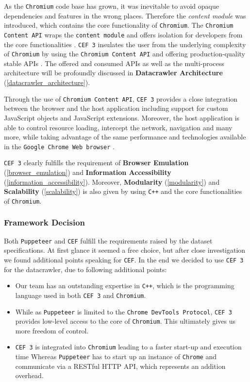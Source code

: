 As the \texttt{Chromium} code base has grown, it was inevitable to avoid opaque dependencies and features in the wrong places. Therefore the \textit{content module} was introduced, which contains the core functionality of \texttt{Chromium}. The \texttt{Chromium Content API} wraps the \texttt{content module} and offers isolation for developers from the core functionalities \cite{ChromiumContentAPI}.
\texttt{CEF 3} insulates the user from the underlying complexity of \texttt{Chromium} by using the \texttt{Chromium Content API} and offering production-quality stable APIs \cite{CEFGeneralUsage}. The offered and consumed APIs as well as the multi-process architecture will be profoundly discussed in \textbf{Datacrawler Architecture} (\ref{datacrawler_architecture}).

Through the use of \texttt{Chromium Content API}, \texttt{CEF 3} provides a close integration between the browser and the host application including support for custom JavaScript objects and JavaScript extensions. Moreover, the host application is able to control resource loading, intercept the network, navigation and many more, while taking advantage of the same performance and technologies available in the \texttt{Google Chrome Web browser} \cite{CEFGeneralUsage}.

\texttt{CEF 3} clearly fulfills the requirement of \textbf{Browser Emulation} (\ref{browser_emulation}) and \textbf{Information Accessibility} (\ref{information_accessibility}). Moreover, \textbf{Modularity} (\ref{modularity}) and \textbf{Scalability} (\ref{scalability}) is also given by using \texttt{C++} and the core functionalities of \texttt{Chromium}.

\subsubsection{Framework Decision}
Both \texttt{Puppeteer} and \texttt{CEF} fulfill the requirements raised by the dataset specifications. At first glance it seemed a free choice, but after close investigation we found additional points speaking for \texttt{CEF}. In the end we decided to use \texttt{CEF 3} for the datacrawler, due to following additional points:
\begin{itemize}
\item Our team has an outstanding expertise in \texttt{C++}, which is the programming language used in both \texttt{CEF 3} and \texttt{Chromium}.
\item While as \texttt{Puppeteer} is limited to the \texttt{Chrome DevTools Protocol}, \texttt{CEF 3} provides low-level access to the core of \texttt{Chromium}. This ultimately gives us more freedom of control.
\item \texttt{CEF 3} is integrated into \texttt{Chromium} leading to a faster start-up and execution time Whereas \texttt{Puppeteer} has to start up an instance of \texttt{Chrome} and communicate via a RESTful HTTP API, which represents an addition overhead.
\end{itemize}
